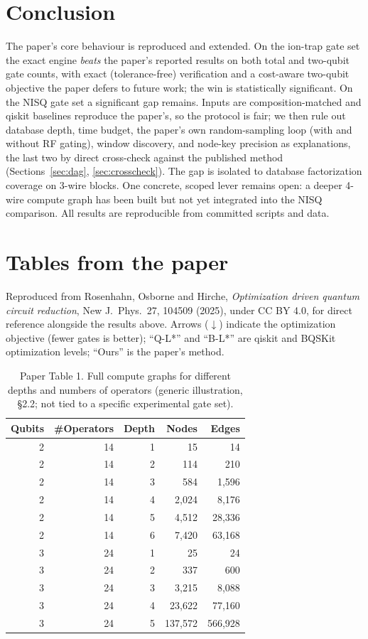\documentclass[11pt,a4paper]{article}
\begin{document}
\section{Conclusion}
\label{sec:conclusion}
The paper's core behaviour is reproduced and extended. On the ion-trap gate set
the exact engine \emph{beats} the paper's reported results on both total and
two-qubit gate counts, with exact (tolerance-free) verification and a
cost-aware two-qubit objective the paper defers to future work; the win is
statistically significant. On the NISQ gate set a significant gap remains.
Inputs are composition-matched and qiskit baselines reproduce the paper's, so
the protocol is fair; we then rule out database depth, time budget, the
paper's own random-sampling loop (with and without RF gating), window
discovery, and node-key precision as explanations, the last two by direct
cross-check against the published method (Sections~\ref{sec:dag},
\ref{sec:crosscheck}). The gap is isolated to database factorization
coverage on 3-wire blocks. One concrete, scoped lever remains open: a
deeper 4-wire compute graph has been built but not yet integrated into the
NISQ comparison. All results are reproducible from committed scripts and
data.


\clearpage
\appendix

\section{Tables from the paper}
\label{sec:apptables}
Reproduced from Rosenhahn, Osborne and Hirche, \emph{Optimization driven
quantum circuit reduction}, New J.\ Phys.\ 27, 104509 (2025), under CC BY
4.0, for direct reference alongside the results above. Arrows ($\downarrow$)
indicate the optimization objective (fewer gates is better); ``Q-L*'' and
``B-L*'' are qiskit and BQSKit optimization levels; ``Ours'' is the paper's
method.

\begin{table}[H]
\centering
\caption{Paper Table 1. Full compute graphs for different depths and
numbers of operators (generic illustration, \S2.2; not tied to a specific
experimental gate set).}
\begin{tabular}{rrrrr}
\toprule
Qubits & \#Operators & Depth & Nodes & Edges \\
\midrule
2 & 14 & 1 & 15 & 14 \\
2 & 14 & 2 & 114 & 210 \\
2 & 14 & 3 & 584 & 1{,}596 \\
2 & 14 & 4 & 2{,}024 & 8{,}176 \\
2 & 14 & 5 & 4{,}512 & 28{,}336 \\
2 & 14 & 6 & 7{,}420 & 63{,}168 \\
3 & 24 & 1 & 25 & 24 \\
3 & 24 & 2 & 337 & 600 \\
3 & 24 & 3 & 3{,}215 & 8{,}088 \\
3 & 24 & 4 & 23{,}622 & 77{,}160 \\
3 & 24 & 5 & 137{,}572 & 566{,}928 \\
\bottomrule
\end{tabular}
\end{table}
\end{document}
